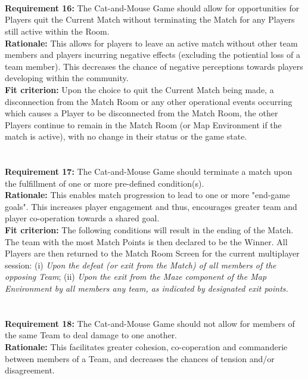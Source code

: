 \documentclass[12pt, titlepage]{article}
\begin{document}
\\
\\
\\ \textbf{Requirement 16:}  The Cat-and-Mouse Game should allow for opportunities for Players quit the Current Match without terminating the Match for any Players still active within the Room.\\
\textbf{Rationale:}  This allows for players to leave an active match without other team members and players incurring negative effects (excluding the potiential loss of a team member). This decreases the chance of negative perceptions towards players developing within the community.\\
\textbf{Fit criterion:}  Upon the choice to quit the Current Match being made, a disconnection from the Match Room or any other operational events occurring which causes a Player to be disconnected from the Match Room, the other Players continue to remain in the Match Room (or Map Environment if the match is active), with no change in their status or the game state.
\\
\\
\\\textbf{Requirement 17:}  The Cat-and-Mouse Game should terminate a match upon the fulfillment of one or more pre-defined condition(s).\\
\textbf{Rationale:}  This enables match progression to lead to one or more "end-game goals". This increases player engagement and thus, encourages greater team and player co-operation towards a shared goal. \\
\textbf{Fit criterion:}  The following conditions will result in the ending of the Match. The team  with the most Match Points is then declared to be the Winner. All Players are then returned to the Match Room Screen for the current multiplayer session: (i)  \emph{Upon the defeat (or exit from the Match) of all members of the opposing Team}; (ii) \emph{Upon the exit from the Maze component of the Map Environment by all members any team, as indicated by designated exit points.}  
\\
\\
\\\textbf{Requirement 18:}  The Cat-and-Mouse Game should not allow for members of the same Team to deal damage to one another.\\
\textbf{Rationale:}  This facilitates greater cohesion, co-coperation and commanderie between members of a Team, and decreases the chances of tension and/or disagreement.   \\
\end{document}
